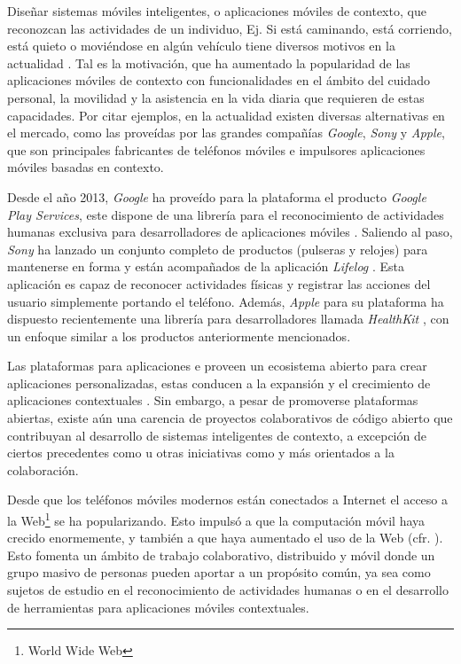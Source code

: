 Diseñar sistemas móviles inteligentes, o aplicaciones móviles de contexto,
que reconozcan las actividades de un individuo, Ej. Si está caminando,
está corriendo, está quieto o moviéndose en algún vehículo tiene diversos
motivos en la actualidad \cite{CampuzanoLopez2015,Google2013l}. Tal
es la motivación, que ha aumentado la popularidad de las aplicaciones
móviles de contexto con funcionalidades en el ámbito del cuidado personal,
la movilidad y la asistencia en la vida diaria que requieren de estas
capacidades. Por citar ejemplos, en la actualidad existen diversas
alternativas en el mercado, como las proveídas por las grandes compañías
\emph{Google}, \emph{Sony} y \emph{Apple}, que son principales fabricantes
de teléfonos móviles e impulsores aplicaciones móviles basadas en
contexto.

Desde el año 2013, \emph{Google} ha proveído para la plataforma \emph{
}\cite{Google2005a} el producto \emph{Google Play Services}, este
dispone de una librería para el reconocimiento de actividades humanas
exclusiva para desarrolladores de aplicaciones móviles \cite{Google2013l}.
Saliendo al paso, \emph{Sony} ha lanzado un conjunto completo de productos
(pulseras y relojes) para mantenerse en forma y están acompañados
de la aplicación \emph{Lifelog} \cite{Sony2016l}. Esta aplicación
es capaz de reconocer actividades físicas y registrar las acciones
del usuario simplemente portando el teléfono. Además, \emph{Apple}
para su plataforma\emph{ } \cite{Apple2007i} ha dispuesto
recientemente una librería para desarrolladores llamada \emph{HealthKit}
\cite{Apple2016h}, con un enfoque similar a los productos anteriormente
mencionados. 

Las plataformas para aplicaciones \emph{} e \emph{}
proveen un ecosistema abierto para crear aplicaciones personalizadas,
estas conducen a la expansión y el crecimiento de aplicaciones contextuales
\cite{Tanenbaum2010}. Sin embargo, a pesar de promoverse plataformas
abiertas, existe aún una carencia de proyectos colaborativos de código
abierto que contribuyan al desarrollo de sistemas inteligentes de
contexto, a excepción de ciertos precedentes como \cite{Kwapisz2011,LaraLabrador2013}
u otras iniciativas como \cite{FUNF2016} y \cite{SensingKit2016}
más orientados a la colaboración.

Desde que los teléfonos móviles modernos están conectados a Internet
el acceso a la Web\footnote{World Wide Web} se ha popularizando.
Esto impulsó a que la computación móvil haya crecido enormemente,
y también a que haya aumentado el uso de la Web (cfr. \cite{NYTimes2008iph}).
Esto fomenta un ámbito de trabajo colaborativo, distribuido y móvil
donde un grupo masivo de personas pueden aportar a un propósito común,
ya sea como sujetos de estudio en el reconocimiento de actividades
humanas o en el desarrollo de herramientas para aplicaciones móviles
contextuales.

